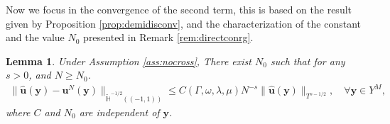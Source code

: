 \documentclass{article}
\newtheorem{lemma}[theorem]{Lemma}
\begin{document}
Now we focus in the convergence of the second term, this is based on the result given by Proposition \ref{prop:demidisconv}, and the characterization of the constant and the value $N_0$ presented in Remark \ref{rem:directconrg}. 

\begin{lemma}
\label{lemma:CN0}
Under Assumption \ref{ass:nocross}, There exist $N_0$ such that for any $s>0$, and $N\geq N_0$.
\begin{align*}
\| \widehat{\mathbf{u}}(\mathbf{y}) - \mathbf{u}^N(\mathbf{y}) \|_{\widetilde{\mathbb{H}}^{-1/2}((-1,1))}  \leq C(\Gamma,\omega, \lambda, \mu) N^{-s} \| \widehat{\mathbf{u}}(\mathbf{y})\|_{T^{s-1/2}}, \quad \forall \mathbf{y} \in Y^M,
\end{align*}
where $C$ and $N_0$ are independent of $\mathbf{y}$.
\end{lemma}
\end{document}
